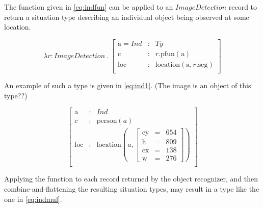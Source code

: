\documentclass[11pt, a4paper]{article}
\begin{document}
The function given in \autoref{eq:indfun} can be applied to an $ImageDetection$ record to return a situation type describing an individual object being observed at some location.

\begin{equation}\label{eq:indfun}
\lambda r : ImageDetection\ .\ 
\left[\begin{array}{rcl}
\text{a} = Ind &:& Ty\\
\text{c} &:& r.\text{pfun}(\text{a})\\
\text{loc} &:& \text{location}(\text{a}, r.\text{seg})\\
\end{array}\right]\end{equation}

An example of such a type is given in \autoref{eq:ind1}.
(The image is an object of this type??)

\begin{equation}\label{eq:ind1}
\left[\begin{array}{rcl}
\text{a} &:& Ind\\
\text{c} &:& \text{person}(a)\\
\text{loc} &:& \text{location}(a, \left[\begin{array}{rcl}
\text{cy} &=& 654\\
\text{h} &=& 809\\
\text{cx} &=& 138\\
\text{w} &=& 276
\end{array}\right])\\
\end{array}\right]\end{equation}

Applying the function to each record returned by the object recognizer, and then combine-and-flattening the resulting situation types, may result in a type like the one in \autoref{eq:indmul}.
\end{document}

